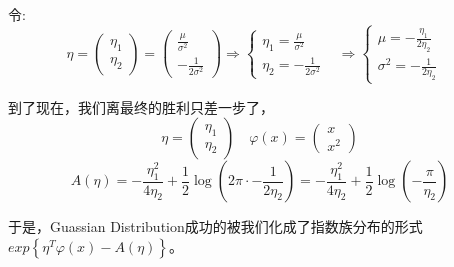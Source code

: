 \documentclass[a4paper]{article}
\begin{document}
令:
\begin{equation}
    \eta=
    \begin{pmatrix}
        \eta_1 \\
        \eta_2
    \end{pmatrix}
    =
    \begin{pmatrix}
        \frac{\mu}{\sigma^2} \\
        -\frac{1}{2\sigma^2}
    \end{pmatrix}
    \Longrightarrow
    \left\{
    \begin{array}{ll}
         \eta_1 = \frac{\mu}{\sigma^2} & \\
         \eta_2 = -\frac{1}{2\sigma^2} &
    \end{array}
    \right.
    \Longrightarrow
    \left\{
    \begin{array}{ll}
         \mu = -\frac{\eta_1}{2\eta_2} & \\
         \sigma^2 = -\frac{1}{2\eta_2} &
    \end{array}
    \right.
\end{equation}

到了现在，我们离最终的胜利只差一步了，
\begin{equation}
   \eta=
    \begin{pmatrix}
        \eta_1 \\
        \eta_2
    \end{pmatrix}
    \quad
    \varphi(x)=
    \begin{pmatrix}
        x \\
        x^2
    \end{pmatrix}   
\end{equation}
\begin{equation}
    A(\eta)=-\frac{\eta_1^2}{4\eta_2}+\frac{1}{2}\log (2\pi\cdot-\frac{1}{2\eta_2})=-\frac{\eta_1^2}{4\eta_2}+\frac{1}{2}\log(-\frac{\pi}{\eta_2})
\end{equation}

于是，Guassian Distribution成功的被我们化成了指数族分布的形式$exp\left\{ \eta^T\varphi(x)-A(\eta) \right\}$。
\end{document}
